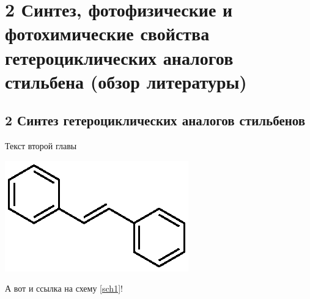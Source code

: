 \chapter{2 Синтез, фотофизические и фотохимические свойства гетероциклических аналогов стильбена (обзор литературы)} \label{chapt2}
	\setcounter{schemecount}{0}  

	\section{2 Синтез гетероциклических аналогов стильбенов}\label{sect2_1}
	
		Текст второй главы
		
		\begin{scheme}
			\includegraphics{Dissertation/images/part1/Stilbene}
		\end{scheme}
	
		А вот и ссылка на схему \ref{sch1}!
		